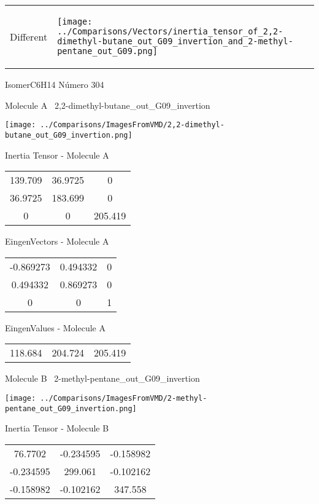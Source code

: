 \vtab[-5mm]
\begin{tabular}{*{2}{m{}}}
\begin{center}
\textcolor{NavyBlue}{\Large Different}
\end{center}
&
\begin{center}
\texttt{[image: ../Comparisons/Vectors/inertia\_tensor\_of\_2,2-dimethyl-butane\_out\_G09\_invertion\_and\_2-methyl-pentane\_out\_G09.png]}
\end{center}
\end{tabular}

 \newpage

\vtab[-3cm]
\begin{center}
{\large IsomerC6H14 \tab Número 304}
\end{center}
\begin{multicols}{2}
\begin{center}

Molecule A \
2,2-dimethyl-butane\_out\_G09\_invertion

\texttt{[image: ../Comparisons/ImagesFromVMD/2,2-dimethyl-butane\_out\_G09\_invertion.png]}

Inertia Tensor - Molecule A \\
\begin{tabular}{|c c c|}
139.709	 & 	36.9725	 & 	0	 \\
36.9725	 & 	183.699	 & 	0	 \\
0	 & 	0	 & 	205.419
\end{tabular}

\vtab
 EingenVectors - Molecule A     \\
\begin{tabular}{|c c c|}
-0.869273	 & 	0.494332	 & 	0	 \\
0.494332	 & 	0.869273	 & 	0	 \\
0	 & 	0	 & 	1
\end{tabular}

\vtab
 EingenValues - Molecule A     \\
\begin{tabular}{|c c c|}
118.684	 & 	204.724	 & 	205.419	 \\
\end{tabular}
\columnbreak

Molecule B \
2-methyl-pentane\_out\_G09\_invertion

\texttt{[image: ../Comparisons/ImagesFromVMD/2-methyl-pentane\_out\_G09\_invertion.png]}

Inertia Tensor - Molecule B \\
\begin{tabular}{|c c c|}
76.7702	 & 	-0.234595	 & 	-0.158982	 \\
-0.234595	 & 	299.061	 & 	-0.102162	 \\
-0.158982	 & 	-0.102162	 & 	347.558
\end{tabular}


\end{center}
\end{multicols}
